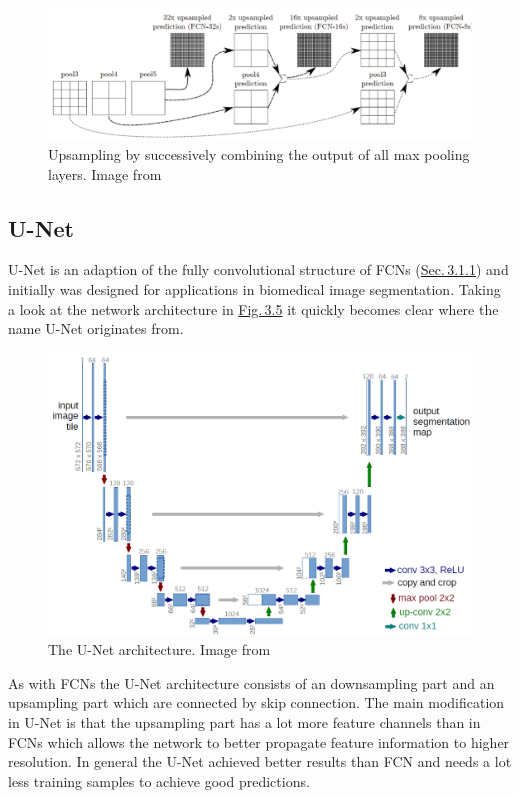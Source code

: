%
\begin{figure} \label{fig:3.4}
    \centering
    \includegraphics[width=.65\textwidth]{Chapters/figures/fcn2.PNG}
    \caption{Upsampling by successively combining the output of all max pooling layers. Image from \cite{fcn}}
\end{figure}
%
\subsection{U-Net} \label{sec:3.1.2}
U-Net \cite{unet} is an adaption of the fully convolutional structure of FCNs (\hyperref[sec:3.1.1]{Sec.\,3.1.1}) and initially was designed for applications in biomedical image segmentation. Taking a look at the network architecture in \hyperref[fig:3.5]{Fig.\,3.5} it quickly becomes clear where the name U-Net originates from.
%
\begin{figure}[h!] \label{fig:3.5}
    \centering
    \includegraphics[width=.70\textwidth]{Chapters/figures/unet.PNG}
    \caption{The U-Net architecture. Image from \cite{unet}}
\end{figure}
%

As with FCNs the U-Net architecture consists of an downsampling part and an upsampling part which are connected by skip connection. The main modification in U-Net is that the upsampling part has a lot more feature channels than in FCNs which allows the network to better propagate feature information to higher resolution. In general the U-Net achieved better results than FCN and needs a lot less training samples to achieve good predictions.

